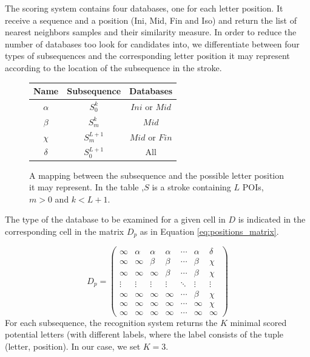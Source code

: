 \documentclass[10pt, conference, compsocconf]{IEEEtran}
\begin{document}
The scoring system contains four databases, one for each letter position. 
It receive a sequence and a position (Ini, Mid, Fin and Iso) and return the list of nearest neighbors samples and their similarity measure.
In order to reduce the number of databases too look for candidates into, we differentiate between four types of subsequences and the corresponding letter position it may represent according to the location of the subsequence in the stroke.\\
\begin{figure}
\centering
\renewcommand{\arraystretch}{1.5}
\begin{tabular}{| c |c | c |}
\hline
  Name     & Subsequence      & Databases       \\
\hline
  $\alpha$ & $S_0^{k}$         & $Ini$ or $Mid$  \\
\hline
  $\beta$  & $S_{m}^{k}$     & $Mid$              \\
\hline
  $\chi$    & $S_{m}^{L+1}$ & $Mid$ or $Fin$   \\
\hline
  $\delta$ & $S_0^{L+1}$     & All                   \\
\hline
\end{tabular}
\caption{A mapping between the subsequence and the possible letter position it may represent. In the table ,$S$ is a stroke containing $L$ POIs, $m>0$ and $k<L+1$.}
\label{table:subsequences_types}
\end{figure}

The type of the database to be examined for a given cell in $D$ is indicated in the corresponding cell in the matrix $D_p$ as in Equation \ref{eq:positions_matrix}. 

\begin{equation}
D_{p}=
\left( 
\begin{array}{ccccccc}
\infty 	& \alpha & \alpha & \alpha  & \cdots & \alpha & \delta \\
\infty  & \infty  & \beta   & \beta   & \cdots  & \beta  & \chi    \\
\infty  & \infty  & \infty   & \beta   & \cdots  & \beta  & \chi    \\
\vdots & \vdots & \vdots  & \vdots & \ddots  & \vdots & \vdots \\
\infty  & \infty  & \infty   & \infty   & \cdots  & \beta  & \chi    \\
\infty  & \infty  & \infty   & \infty   & \cdots  & \infty  & \chi    \\
\infty  & \infty  & \infty   & \infty   & \cdots  & \infty  & \infty \end{array} \right)
\label{eq:positions_matrix}
\end{equation}
For each subsequence, the recognition system returns the $K$ minimal scored potential letters (with different labels, where the label consists of the tuple (letter, position). In our case, we set $K=3$.\\
\end{document}
